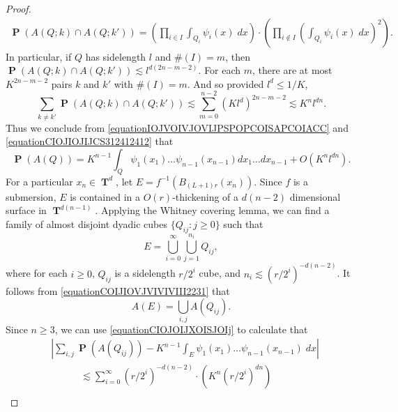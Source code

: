 \documentclass[dvipsnames,letterpaper,12pt]{article}
\numberwithin{equation}{section}
\DeclareMathOperator{\TT}{\mathbf{T}}
\numberwithin{theorem}{section}
\DeclareMathOperator{\PP}{\mathbf{P}}
\begin{document}
\begin{proof}
\begin{equation}
    \begin{split}
        \PP(A(Q;k) \cap A(Q;k')) = \left( \prod_{i \in I} \int_{Q_i} \psi_i(x)\; dx \right) \cdot \left( \prod_{i \not \in I} \left( \int_{Q_i} \psi_i(x)\; dx \right)^2 \right).
    \end{split}
    \end{equation}
    In particular, if $Q$ has sidelength $l$ and $\#(I) = m$, then $\PP(A(Q;k) \cap A(Q;k')) \lesssim l^{d(2n - m - 2)}$. For each $m$, there are at most $K^{2n - m - 2}$ pairs $k$ and $k'$ with $\#(I) = m$. And so provided $l^d \leq 1/K$,
    \begin{equation} \label{equationCIOJIOJIJCS312412412}
        \sum_{k \neq k'} \PP(A(Q;k) \cap A(Q;k')) \lesssim \sum_{m = 0}^{n-2} (Kl^d)^{2n-m-2} \lesssim K^n l^{dn}.
    \end{equation}
    Thus we conclude from \eqref{equationIOJVOIVJOVIJPSPOPCOISAPCOIACC} and \eqref{equationCIOJIOJIJCS312412412} that
    \begin{equation} \label{equationCIOJOIJXOISJOIj}
        \PP(A(Q)) = K^{n-1} \int_Q \psi_1(x_1) \dots \psi_{n-1}(x_{n-1}) dx_1 \dots dx_{n-1} + O(K^n l^{dn}).
    \end{equation}
    For a particular $x_n \in \TT^d$, let $E = f^{-1}(B_{(L+1)r}(x_n))$. Since $f$ is a submersion, $E$ is contained in a $O(r)$-thickening of a $d(n-2)$ dimensional surface in $\TT^{d(n-1)}$. Applying the Whitney covering lemma, we can find a family of almost disjoint dyadic cubes $\{ Q_{ij} : j \geq 0 \}$ such that
    \begin{equation} \label{equationCOIJIOVJVIVIVIII2231}
        E = \bigcup_{i = 0}^\infty \bigcup_{j = 1}^{n_i} Q_{ij},
    \end{equation}
    where for each $i \geq 0$, $Q_{ij}$ is a sidelength $r/2^i$ cube, and $n_i \lesssim (r/2^i)^{-d(n-2)}$. It follows from \eqref{equationCOIJIOVJVIVIVIII2231} that
    \begin{equation} \label{equationCOJIAWOIJCAWOIJOI}
        A(E) = \bigcup_{i,j} A(Q_{ij}).
    \end{equation}
    Since $n \geq 3$, we can use \eqref{equationCIOJOIJXOISJOIj} to calculate that
    \begin{equation} \label{equationCOIJCOIJSI}
    \begin{split}
        &\left| \sum_{i,j} \PP(A(Q_{ij})) - K^{n-1} \int_E \psi_1(x_1) \dots \psi_{n-1}(x_{n-1})\; dx \right|\\
        &\quad\quad\quad\lesssim \sum_{i = 0}^\infty (r/2^i)^{-d(n-2)} \cdot \left( K^n (r/2^i)^{dn} \right)\\

\end{split}
\end{equation}
\end{proof}
\end{document}
